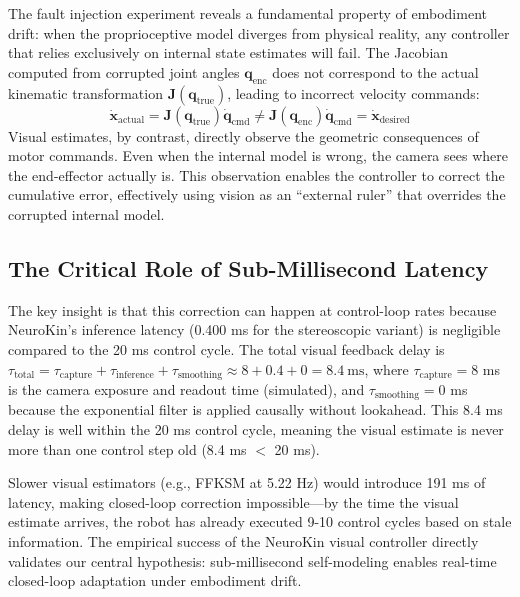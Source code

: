 \documentclass[12pt,a4paper,oneside]{report}
\begin{document}
The fault injection experiment reveals a fundamental property of embodiment drift: when the proprioceptive model diverges from physical reality, any controller that relies exclusively on internal state estimates will fail. The Jacobian computed from corrupted joint angles $\mathbf{q}_{\text{enc}}$ does not correspond to the actual kinematic transformation $\mathbf{J}(\mathbf{q}_{\text{true}})$, leading to incorrect velocity commands:
\begin{equation}
\dot{\mathbf{x}}_{\text{actual}} = \mathbf{J}(\mathbf{q}_{\text{true}}) \dot{\mathbf{q}}_{\text{cmd}} \neq \mathbf{J}(\mathbf{q}_{\text{enc}}) \dot{\mathbf{q}}_{\text{cmd}} = \dot{\mathbf{x}}_{\text{desired}}
\end{equation}
Visual estimates, by contrast, directly observe the geometric consequences of motor commands. Even when the internal model is wrong, the camera sees where the end-effector actually is. This observation enables the controller to correct the cumulative error, effectively using vision as an ``external ruler'' that overrides the corrupted internal model.

\subsection{The Critical Role of Sub-Millisecond Latency}

The key insight is that this correction can happen at control-loop rates because NeuroKin's inference latency (0.400 ms for the stereoscopic variant) is negligible compared to the 20 ms control cycle. The total visual feedback delay is $\tau_{\text{total}} = \tau_{\text{capture}} + \tau_{\text{inference}} + \tau_{\text{smoothing}} \approx 8 + 0.4 + 0 = 8.4\ \text{ms}$, where $\tau_{\text{capture}} = 8$ ms is the camera exposure and readout time (simulated), and $\tau_{\text{smoothing}} = 0$ ms because the exponential filter is applied causally without lookahead. This 8.4 ms delay is well within the 20 ms control cycle, meaning the visual estimate is never more than one control step old (8.4 ms $<$ 20 ms).

Slower visual estimators (e.g., FFKSM at 5.22 Hz) would introduce 191 ms of latency, making closed-loop correction impossible---by the time the visual estimate arrives, the robot has already executed 9-10 control cycles based on stale information. The empirical success of the NeuroKin visual controller directly validates our central hypothesis: sub-millisecond self-modeling enables real-time closed-loop adaptation under embodiment drift.
\end{document}
